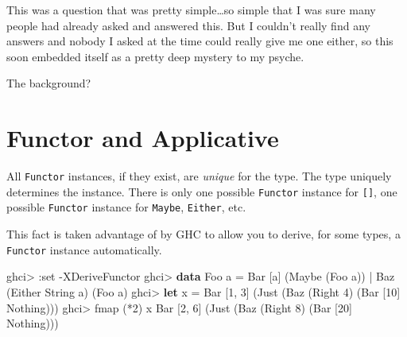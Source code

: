 \documentclass[]{article}
\newenvironment{Shaded}{}{}
\newcommand{\DataTypeTok}[1]{\textcolor[rgb]{0.56,0.13,0.00}{#1}}
\newcommand{\DecValTok}[1]{\textcolor[rgb]{0.25,0.63,0.44}{#1}}
\newcommand{\FunctionTok}[1]{\textcolor[rgb]{0.02,0.16,0.49}{#1}}
\newcommand{\KeywordTok}[1]{\textcolor[rgb]{0.00,0.44,0.13}{\textbf{#1}}}
\newcommand{\NormalTok}[1]{#1}
\newcommand{\OperatorTok}[1]{\textcolor[rgb]{0.40,0.40,0.40}{#1}}
\newcommand{\OtherTok}[1]{\textcolor[rgb]{0.00,0.44,0.13}{#1}}
\begin{document}
This was a question that was pretty simple\ldots so simple that I was sure many
people had already asked and answered this. But I couldn't really find any
answers and nobody I asked at the time could really give me one either, so this
soon embedded itself as a pretty deep mystery to my psyche.

The background?

\section{Functor and Applicative}\label{functor-and-applicative}

All \texttt{Functor} instances, if they exist, are \emph{unique} for the type.
The type uniquely determines the instance. There is only one possible
\texttt{Functor} instance for \texttt{{[}{]}}, one possible \texttt{Functor}
instance for \texttt{Maybe}, \texttt{Either}, etc.

This fact is taken advantage of by GHC to allow you to derive, for some types, a
\texttt{Functor} instance automatically.

\begin{Shaded}
\begin{Highlighting}[]
\NormalTok{ghci}\OperatorTok{\textgreater{}} \OperatorTok{:}\NormalTok{set }\OperatorTok{{-}}\DataTypeTok{XDeriveFunctor}
\NormalTok{ghci}\OperatorTok{\textgreater{}} \KeywordTok{data} \DataTypeTok{Foo}\NormalTok{ a }\OtherTok{=} \DataTypeTok{Bar}\NormalTok{ [a] (}\DataTypeTok{Maybe}\NormalTok{ (}\DataTypeTok{Foo}\NormalTok{ a)) }\OperatorTok{|} \DataTypeTok{Baz}\NormalTok{ (}\DataTypeTok{Either} \DataTypeTok{String}\NormalTok{ a) (}\DataTypeTok{Foo}\NormalTok{ a)}
\NormalTok{ghci}\OperatorTok{\textgreater{}} \KeywordTok{let}\NormalTok{ x }\OtherTok{=} \DataTypeTok{Bar}\NormalTok{ [}\DecValTok{1}\NormalTok{, }\DecValTok{3}\NormalTok{] (}\DataTypeTok{Just}\NormalTok{ (}\DataTypeTok{Baz}\NormalTok{ (}\DataTypeTok{Right} \DecValTok{4}\NormalTok{) (}\DataTypeTok{Bar}\NormalTok{ [}\DecValTok{10}\NormalTok{] }\DataTypeTok{Nothing}\NormalTok{)))}
\NormalTok{ghci}\OperatorTok{\textgreater{}} \FunctionTok{fmap}\NormalTok{ (}\OperatorTok{*}\DecValTok{2}\NormalTok{) x}
\DataTypeTok{Bar}\NormalTok{ [}\DecValTok{2}\NormalTok{, }\DecValTok{6}\NormalTok{] (}\DataTypeTok{Just}\NormalTok{ (}\DataTypeTok{Baz}\NormalTok{ (}\DataTypeTok{Right} \DecValTok{8}\NormalTok{) (}\DataTypeTok{Bar}\NormalTok{ [}\DecValTok{20}\NormalTok{] }\DataTypeTok{Nothing}\NormalTok{)))}
\end{Highlighting}
\end{Shaded}
\end{document}
